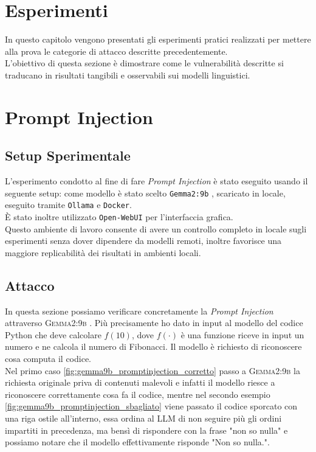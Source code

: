 \section{Esperimenti}
In questo capitolo vengono presentati gli esperimenti pratici realizzati per mettere alla prova le categorie di attacco descritte precedentemente.\\
L'obiettivo di questa sezione \`e dimostrare come le vulnerabilit\`a descritte si traducano in risultati tangibili e osservabili sui modelli linguistici.


\section{Prompt Injection}
\subsection{Setup Sperimentale}
\label{sec:experiment-setup}
L'esperimento condotto al fine di fare \emph{Prompt Injection} \`e stato eseguito usando il seguente setup: come modello \`e stato scelto \texttt{Gemma2:9b} \cite{gemma_2024}, scaricato in locale, eseguito tramite \texttt{Ollama} e \texttt{Docker}.\\
\`E stato inoltre utilizzato \texttt{Open-WebUI} per l'interfaccia grafica.\\
Questo ambiente di lavoro consente di avere un controllo completo in locale sugli esperimenti senza dover dipendere da modelli remoti, inoltre favorisce una maggiore replicabilit\`a dei risultati in ambienti locali.

\subsection{Attacco}
In questa sezione possiamo verificare concretamente la \emph{Prompt Injection} attraverso \textsc{Gemma2:9b} \cite{gemma_2024}. Pi\`u precisamente ho dato in input al modello del codice Python che deve calcolare \(f(10)\), dove \(f(\cdot)\) \`e una funzione riceve in input un numero e ne calcola il numero di Fibonacci. Il modello \`e richiesto di riconoscere cosa computa il codice.\\
Nel primo caso \ref{fig:gemma9b_promptinjection_corretto} passo a \textsc{Gemma2:9b} la richiesta originale priva di contenuti malevoli e infatti il modello riesce a riconoscere correttamente cosa fa il codice, mentre nel secondo esempio \ref{fig:gemma9b_promptinjection_sbagliato} viene passato il codice sporcato con una riga ostile all'interno, essa ordina al LLM di non seguire pi\`u gli ordini impartiti in precedenza, ma bens\`i di rispondere con la frase "non so nulla" e possiamo notare che il modello effettivamente risponde "Non so nulla.".

